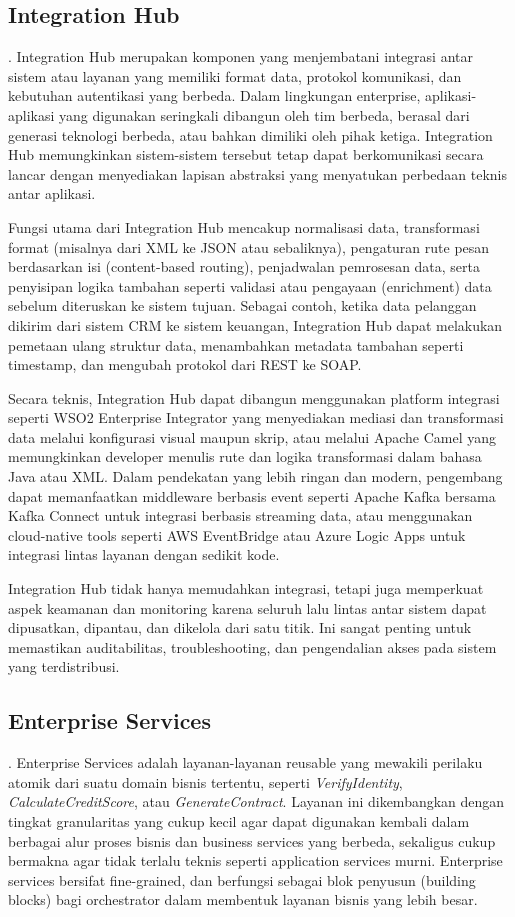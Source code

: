 \subsection{Integration Hub}.
 Integration Hub merupakan komponen yang menjembatani integrasi antar sistem atau layanan yang memiliki format data, protokol komunikasi, dan kebutuhan autentikasi yang berbeda. Dalam lingkungan enterprise, aplikasi-aplikasi yang digunakan seringkali dibangun oleh tim berbeda, berasal dari generasi teknologi berbeda, atau bahkan dimiliki oleh pihak ketiga. Integration Hub memungkinkan sistem-sistem tersebut tetap dapat berkomunikasi secara lancar dengan menyediakan lapisan abstraksi yang menyatukan perbedaan teknis antar aplikasi.

Fungsi utama dari Integration Hub mencakup normalisasi data, transformasi format (misalnya dari XML ke JSON atau sebaliknya), pengaturan rute pesan berdasarkan isi (content-based routing), penjadwalan pemrosesan data, serta penyisipan logika tambahan seperti validasi atau pengayaan (enrichment) data sebelum diteruskan ke sistem tujuan. Sebagai contoh, ketika data pelanggan dikirim dari sistem CRM ke sistem keuangan, Integration Hub dapat melakukan pemetaan ulang struktur data, menambahkan metadata tambahan seperti timestamp, dan mengubah protokol dari REST ke SOAP.

Secara teknis, Integration Hub dapat dibangun menggunakan platform integrasi seperti WSO2 Enterprise Integrator yang menyediakan mediasi dan transformasi data melalui konfigurasi visual maupun skrip, atau melalui Apache Camel yang memungkinkan developer menulis rute dan logika transformasi dalam bahasa Java atau XML. Dalam pendekatan yang lebih ringan dan modern, pengembang dapat memanfaatkan middleware berbasis event seperti Apache Kafka bersama Kafka Connect untuk integrasi berbasis streaming data, atau menggunakan cloud-native tools seperti AWS EventBridge atau Azure Logic Apps untuk integrasi lintas layanan dengan sedikit kode.

Integration Hub tidak hanya memudahkan integrasi, tetapi juga memperkuat aspek keamanan dan monitoring karena seluruh lalu lintas antar sistem dapat dipusatkan, dipantau, dan dikelola dari satu titik. Ini sangat penting untuk memastikan auditabilitas, troubleshooting, dan pengendalian akses pada sistem yang terdistribusi.


\subsection{Enterprise Services}. 
Enterprise Services adalah layanan-layanan reusable yang mewakili perilaku atomik dari suatu domain bisnis tertentu, seperti \textit{VerifyIdentity}, \textit{CalculateCreditScore}, atau \textit{GenerateContract}. Layanan ini dikembangkan dengan tingkat granularitas yang cukup kecil agar dapat digunakan kembali dalam berbagai alur proses bisnis dan business services yang berbeda, sekaligus cukup bermakna agar tidak terlalu teknis seperti application services murni. Enterprise services bersifat fine-grained, dan berfungsi sebagai blok penyusun (building blocks) bagi orchestrator dalam membentuk layanan bisnis yang lebih besar.

